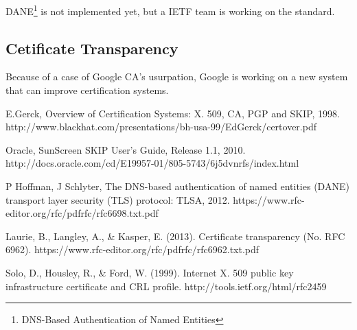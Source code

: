 \documentclass[journal, a4paper]{IEEEtran}
\begin{document}
DANE\footnote{DNS-Based Authentication of Named Entities} is not implemented yet, but a IETF team is working on the standard.

\subsection{Cetificate Transparency}

Because of a case of Google CA's usurpation, Google is working on a new system that can improve certification systems.

\nocite{*}

\begin{thebibliography}{99}

 E.Gerck, Overview of Certification Systems: X. 509, CA, PGP and SKIP, 1998. http://www.blackhat.com/presentations/bh-usa-99/EdGerck/certover.pdf

 Oracle, SunScreen SKIP User's Guide, Release 1.1, 2010. http://docs.oracle.com/cd/E19957-01/805-5743/6j5dvnrfs/index.html

 P Hoffman, J Schlyter, The DNS-based authentication of named entities (DANE) transport layer security (TLS) protocol: TLSA, 2012. https://www.rfc-editor.org/rfc/pdfrfc/rfc6698.txt.pdf

 Laurie, B., Langley, A., \& Kasper, E. (2013). Certificate transparency (No. RFC 6962). https://www.rfc-editor.org/rfc/pdfrfc/rfc6962.txt.pdf

 Solo, D., Housley, R., \& Ford, W. (1999). Internet X. 509 public key infrastructure certificate and CRL profile. http://tools.ietf.org/html/rfc2459

\end{thebibliography}

\end{document}
